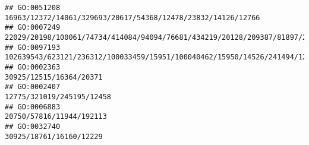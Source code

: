 \documentclass[
]{article}
\begin{document}
\begin{verbatim}
## GO:0051208                                                                                                                                                                                                                                                                                                                                                 16963/12372/14061/329693/20617/54368/12478/23832/14126/12766
## GO:0007249                                                                                                                                                                                                                                                                                                          22029/20198/100061/74734/414084/94094/76681/434219/20128/209387/81897/29820/21943/16994/24108/16149
## GO:0097193                                                                                                                                                                                                                                                                                102639543/623121/236312/100033459/15951/100040462/15950/14526/241494/12176/12047/637515/209027/76933/217845/18095/13078/16149
## GO:0002363                                                                                                                                                                                                                                                                                                                                                                                      30925/12515/16364/20371
## GO:0002407                                                                                                                                                                                                                                                                                                                                                                                    12775/321019/245195/12458
## GO:0006883                                                                                                                                                                                                                                                                                                                                                                                     20750/57816/11944/192113
## GO:0032740                                                                                                                                                                                                                                                                                                                                                                                      30925/18761/16160/12229

\end{verbatim}
\end{document}
